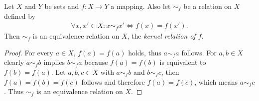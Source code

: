 \begin{theorem}
    Let $X$ and $Y$ be sets and $f\colon X\rightarrow Y$ a mapping. Also let $\sim_f$ be a relation on $X$ defined by \begin{align}\forall x,x'\in X\colon x\sim_f x'\Leftrightarrow f(x)=f(x').\end{align} Then $\sim_f$ is an equivalence relation on $X$, the \emph{kernel relation of $f$}.
\end{theorem}
\begin{proof}
    For every $a\in X$, $f(a)=f(a)$ holds, thus $a\sim_f a$ follows. For $a,b\in X$ clearly $a\sim_f b$ implies $b\sim_f a$ because $f(a)=f(b)$ is equivalent to $f(b)=f(a)$. Let $a,b,c\in X$ with $a\sim_f b$ and $b\sim_f c$, then $f(a)=f(b)=f(c)$ follows and therefore $f(a)=f(c)$, which means $a\sim_f c$. Thus $\sim_f$ is an equivalence relation on $X$.
\end{proof}

